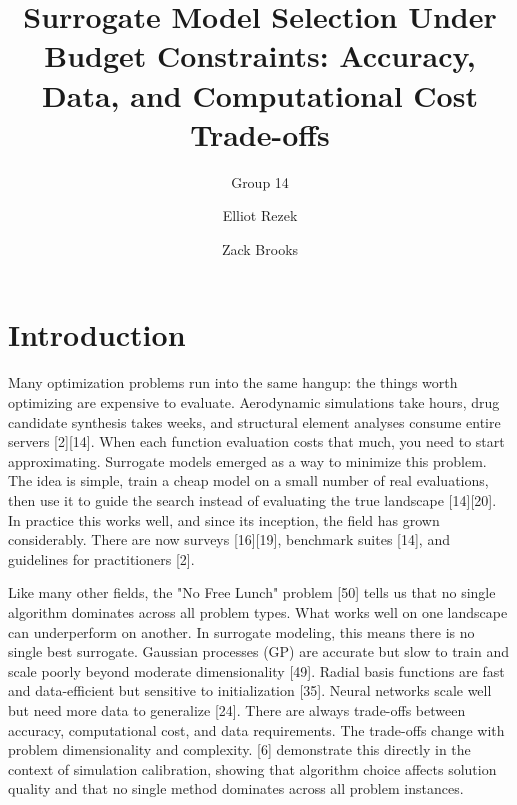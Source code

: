 \documentclass[sigconf,nonacm]{acmart}
\title{Surrogate Model Selection Under Budget Constraints:
Accuracy, Data, and Computational Cost Trade-offs}
\author{Group 14}
\author{Elliot Rezek}
\author{Zack Brooks}
\affiliation{%
  \institution{North Carolina State University}
  \city{Raleigh}
  \state{North Carolina}
  \country{USA}
}
\begin{document}
\maketitle

\section{Introduction}

Many optimization problems run into the same hangup: the things worth optimizing are expensive to evaluate. Aerodynamic simulations take hours, drug candidate synthesis takes weeks, and structural element analyses consume entire servers [2][14]. When each function evaluation costs that much, you need to start approximating. Surrogate models emerged as a way to minimize this problem. The idea is simple, train a cheap model on a small number of real evaluations, then use it to guide the search instead of evaluating the true landscape [14][20]. In practice this works well, and since its inception, the field has grown considerably. There are now surveys [16][19], benchmark suites [14], and guidelines for practitioners [2].

Like many other fields, the "No Free Lunch" problem [50] tells us that no single algorithm dominates across all problem types. What works well on one landscape can underperform on another. In surrogate modeling, this means there is no single best surrogate. Gaussian processes (GP) are accurate but slow to train and scale poorly beyond moderate dimensionality [49]. Radial basis functions are fast and data-efficient but sensitive to initialization [35]. Neural networks scale well but need more data to generalize [24]. There are always trade-offs between accuracy, computational cost, and data requirements. The trade-offs change with problem dimensionality and complexity. [6] demonstrate this directly in the context of simulation calibration, showing that algorithm choice affects solution quality and that no single method dominates across all problem instances.
\end{document}
